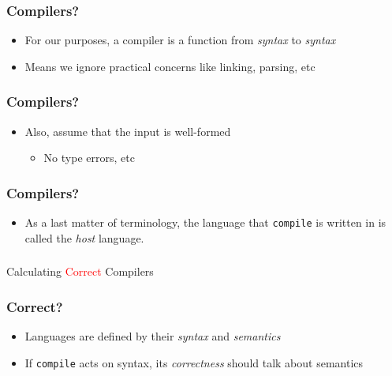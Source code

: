 \documentclass[usenames,dvipsnames]{beamer}
\newcommand{\compile}{\texttt{compile}}
\begin{document}

\begin{frame}
  \frametitle{Compilers?}

  \begin{itemize}
    \item For our purposes, a compiler is a function from \emph{syntax} to
      \emph{syntax}

    \item Means we ignore practical concerns like linking, parsing, etc
  \end{itemize}
\end{frame}


\begin{frame}
  \frametitle{Compilers?}

  \begin{itemize}
    \item Also, assume that the input is well-formed
      \begin{itemize}
        \item No type errors, etc
      \end{itemize}
  \end{itemize}
\end{frame}


\begin{frame}
  \frametitle{Compilers?}

  \begin{itemize}
    \item As a last matter of terminology, the language that \compile{} is
      written in is called the \emph{host} language.
  \end{itemize}
\end{frame}


\begin{frame}
  \frametitle{}

  \begin{center}
    \Huge Calculating \textcolor{red}{Correct} Compilers
  \end{center}
\end{frame}


\begin{frame}
  \frametitle{Correct?}

  \begin{itemize}
    \item Languages are defined by their \emph{syntax} and \emph{semantics}
    \item If \compile{} acts on syntax, its \textit{correctness} should talk
      about semantics
  \end{itemize}
\end{frame}
\end{document}
